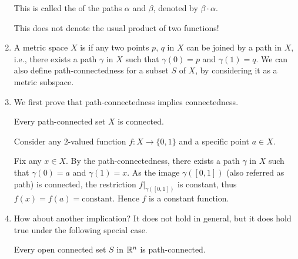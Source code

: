 \begin{enumerate}
This is called the  of the paths \(\alpha\) and \(\beta\),
denoted by \(\beta\cdot \alpha\). \begin{warning}
This does not denote the usual product of two functions!
\end{warning}

\item A metric space \(X\) is  if any two points \(p\),
\(q\) in \(X\) can be joined by a path in \(X\), i.e., there exists a path
\(\gamma\) in \(X\) such that \(\gamma(0)=p\) and \(\gamma(1)=q\). We can also
define path-connectedness for a subset \(S\) of \(X\), by considering it as a
metric subspace.

\item We first prove that path-connectedness implies connectedness.
\begin{theorem}
\label{thm:path-conn-imp-conn}
Every path-connected set \(X\) is connected.
\end{theorem}
\begin{pf}
Consider any \(2\)-valued function \(f:X\to\{0,1\}\) and a specific point
\(a\in X\).

Fix any \(x\in X\). By the path-connectedness, there exists a path \(\gamma\)
in \(X\) such that \(\gamma(0)=a\) and \(\gamma(1)=x\). As the image
\(\gamma([0,1])\) (also referred as path) is connected, the restriction
\(f|_{\gamma([0,1])}\) is constant, thus \(f(x)=f(a)=\text{constant}\).
Hence \(f\) is a constant function.
\end{pf}

\item How about another implication? It does not hold in general, but it does
hold true under the following special case.

\begin{theorem}
\label{thm:open-conn-rn-path-conn}
Every open connected set \(S\) in \(\mathbb{R}^n\) is path-connected.
\end{theorem}
\end{enumerate}
